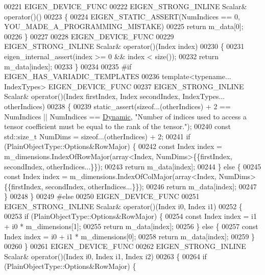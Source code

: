 \begin{DoxyCode}
00221     EIGEN\_DEVICE\_FUNC
00222     EIGEN\_STRONG\_INLINE Scalar& operator()()
00223     \{
00224       EIGEN\_STATIC\_ASSERT(NumIndices == 0, YOU\_MADE\_A\_PROGRAMMING\_MISTAKE)
00225       \textcolor{keywordflow}{return} m\_data[0];
00226     \}
00227 
00228     EIGEN\_DEVICE\_FUNC
00229     EIGEN\_STRONG\_INLINE Scalar& operator()(Index index)
00230     \{
00231       eigen\_internal\_assert(index >= 0 && index < size());
00232       \textcolor{keywordflow}{return} m\_data[index];
00233     \}
00234 
00235 \textcolor{preprocessor}{#if EIGEN\_HAS\_VARIADIC\_TEMPLATES}
00236     \textcolor{keyword}{template}<\textcolor{keyword}{typename}... IndexTypes> EIGEN\_DEVICE\_FUNC
00237     EIGEN\_STRONG\_INLINE Scalar& operator()(Index firstIndex, Index secondIndex, IndexTypes... otherIndices)
00238     \{
00239       static\_assert(\textcolor{keyword}{sizeof}...(otherIndices) + 2 == NumIndices || NumIndices == 
      \hyperlink{namespace_eigen_ad81fa7195215a0ce30017dfac309f0b2}{Dynamic}, \textcolor{stringliteral}{"Number of indices used to access a tensor coefficient must be equal to the rank of the
       tensor."});
00240       \textcolor{keyword}{const} std::size\_t NumDims = \textcolor{keyword}{sizeof}...(otherIndices) + 2;
00241       \textcolor{keywordflow}{if} (PlainObjectType::Options&RowMajor) \{
00242         \textcolor{keyword}{const} Index index = m\_dimensions.IndexOfRowMajor(array<Index, NumDims>\{\{firstIndex, secondIndex, 
      otherIndices...\}\});
00243         \textcolor{keywordflow}{return} m\_data[index];
00244       \} \textcolor{keywordflow}{else} \{
00245         \textcolor{keyword}{const} Index index = m\_dimensions.IndexOfColMajor(array<Index, NumDims>\{\{firstIndex, secondIndex, 
      otherIndices...\}\});
00246         \textcolor{keywordflow}{return} m\_data[index];
00247       \}
00248     \}
00249 \textcolor{preprocessor}{#else}
00250     EIGEN\_DEVICE\_FUNC
00251     EIGEN\_STRONG\_INLINE Scalar& operator()(Index i0, Index i1)
00252     \{
00253        \textcolor{keywordflow}{if} (PlainObjectType::Options&RowMajor) \{
00254          \textcolor{keyword}{const} Index index = i1 + i0 * m\_dimensions[1];
00255         \textcolor{keywordflow}{return} m\_data[index];
00256       \} \textcolor{keywordflow}{else} \{
00257         \textcolor{keyword}{const} Index index = i0 + i1 * m\_dimensions[0];
00258         \textcolor{keywordflow}{return} m\_data[index];
00259       \}
00260     \}
00261     EIGEN\_DEVICE\_FUNC
00262     EIGEN\_STRONG\_INLINE Scalar& operator()(Index i0, Index i1, Index i2)
00263     \{
00264        \textcolor{keywordflow}{if} (PlainObjectType::Options&RowMajor) \{

\end{DoxyCode}
